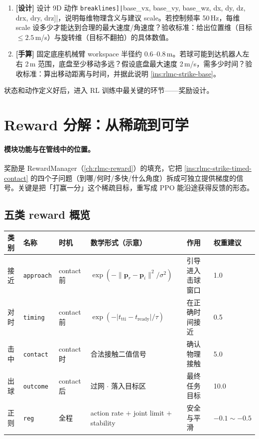 \begin{practice}[本节动手任务]
\begin{enumerate}
  \item \textbf{[设计]} 设计 9D 动作 \Verb[breaklines]|[base_vx, base_vy, base_wz, dx, dy, dz, drx, dry, drz]|，说明每维物理含义与建议 scale。若控制频率 50\,Hz，每维 scale 设多少才能达到合理的最大速度/角速度？验收标准：给出位置维（目标 $\le 2.5$\,m/s）与旋转维（目标不翻拍）的具体数值。
  \item \textbf{[手算]} 固定底座机械臂 workspace 半径约 0.6--0.8\,m。若球可能到达机器人左右 2\,m 范围，底盘至少移动多远？假设底盘最大速度 2\,m/s，需多少时间？验收标准：算出移动距离与时间，并据此说明 \cref{ins:rlmc-strike-base}。
\end{enumerate}
\end{practice}

\noindent{}状态和动作定义好后，进入 RL 训练中最关键的环节——奖励设计。

\section{Reward 分解：从稀疏到可学}
\label{sec:rlmc-strike-reward}

\paragraph{模块功能与在管线中的位置。}奖励是 RewardManager（\cref{ch:rlmc-reward}）的填充，它把 \cref{ins:rlmc-strike-timed-contact} 的四个子问题（到哪/何时/多快/什么角度）拆成可独立提供梯度的信号。关键是把「打赢一分」这个稀疏目标，重写成 PPO 能沿途获得反馈的形态。

\subsection{五类 reward 概览}

\begin{center}
\small
\begin{tabular}{@{}llllll@{}}
\toprule
类别 & 名称 & 时机 & 数学形式（示意） & 作用 & 权重建议 \\
\midrule
接近 & \verb|approach| & contact 前 & $\exp(-\lVert\mathbf{p}_r-\mathbf{p}_i\rVert^2/\sigma^2)$ & 引导进入击球窗口 & 1.0 \\
对时 & \verb|timing| & contact 前 & $\exp(-\lvert t_{\text{tti}}-t_{\text{ready}}\rvert/\tau)$ & 在正确时间接近 & 0.5 \\
击中 & \verb|contact| & contact 时 & 合法接触二值信号 & 确认物理接触 & 5.0 \\
出球 & \verb|outcome| & contact 后 & 过网 $\cdot$ 落入目标区 & 最终任务目标 & 10.0 \\
正则 & \verb|reg| & 全程 & action rate $+$ joint limit $+$ stability & 安全与平滑 & $-0.1\sim-0.5$ \\
\bottomrule
\end{tabular}
\end{center}

